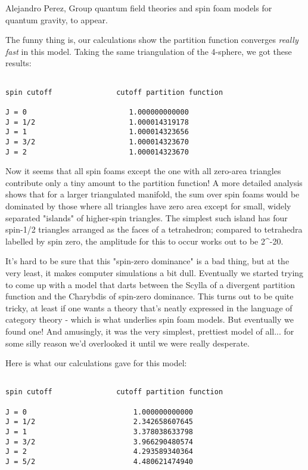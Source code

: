 Alejandro Perez, Group quantum field theories and spin foam models for
quantum gravity, to appear. 

The funny thing is, our calculations show the partition function 
converges \emph{really fast} in this model.  Taking the same triangulation 
of the 4-sphere, we got these results:


\begin{verbatim}

spin cutoff               cutoff partition function 

J = 0                        1.000000000000 
J = 1/2                      1.000014319178                 
J = 1                        1.000014323656                 
J = 3/2                      1.000014323670                 
J = 2                        1.000014323670                 
\end{verbatim}
    
Now it seems that all spin foams except the one with all zero-area
triangles contribute only a tiny amount to the partition function!  
A more detailed analysis shows that for a larger triangulated manifold,
the sum over spin foams would be dominated by those where all triangles
have zero area except for small, widely separated "islands" of
higher-spin triangles.  The simplest such island has four spin-1/2
triangles arranged as the faces of a tetrahedron; compared to tetrahedra
labelled by spin zero, the amplitude for this to occur works out to be 
2^{-20}.  

It's hard to be sure that this "spin-zero dominance" is a bad
thing, but at the very least, it makes computer simulations a bit dull.
Eventually we started trying to come up with a model that darts between
the Scylla of a divergent partition function and the Charybdis of
spin-zero dominance.  This turns out to be quite tricky, at least if one
wants a theory that's neatly expressed in the language of category
theory - which is what underlies spin foam models.  But eventually we
found one!  And amusingly, it was the very simplest, prettiest model of
all... for some silly reason we'd overlooked it until we were really
desperate.

Here is what our calculations gave for this model:


\begin{verbatim}

spin cutoff               cutoff partition function 

J = 0                         1.000000000000  
J = 1/2                       2.342658607645   
J = 1                         3.378038633798   
J = 3/2                       3.966290480574   
J = 2                         4.293589340364   
J = 5/2                       4.480621474940   
\end{verbatim}
    

